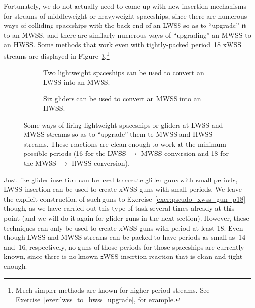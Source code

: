 Fortunately, we do not actually need to come up with new insertion mechanisms for streams of middleweight or heavyweight spaceships, since there are numerous ways of colliding spaceships with the back end of an LWSS so as to ``upgrade'' it to an MWSS, and there are similarly numerous ways of ``upgrading'' an MWSS to an HWSS. Some methods that work even with tightly-packed period~18 xWSS streams are displayed in Figure~\ref{fig:xwss_upgrade}.\footnote{Much simpler methods are known for higher-period streams. See Exercise~\ref{exer:lwss_to_hwss_upgrade}, for example.}

\begin{figure}[!htb]
	\centering
	\begin{subfigure}{0.525\textwidth}
		\centering
		\caption{Two lightweight spaceships can be used to convert an LWSS into an MWSS.}\label{fig:lwss_upgrade}
	\end{subfigure} \hfill \begin{subfigure}{0.445\textwidth}
		\centering
		\caption{Six gliders can be used to convert an MWSS into an HWSS.}\label{fig:mwss_upgrade}
	\end{subfigure}
	\caption{Some ways of firing lightweight spaceships or gliders at LWSS and MWSS streams so as to ``upgrade'' them to MWSS and HWSS streams. These reactions are clean enough to work at the minimum possible periods (16 for the LWSS $\rightarrow$ MWSS conversion and 18 for the MWSS $\rightarrow$ HWSS conversion).}\label{fig:xwss_upgrade}
\end{figure}

Just like glider insertion can be used to create glider guns with small periods, LWSS insertion can be used to create xWSS guns with small periods. We leave the explicit construction of such guns to Exercise~\ref{exer:pseudo_xwss_gun_p18} though, as we have carried out this type of task several times already at this point (and we will do it again for glider guns in the next section). However, these techniques can only be used to create xWSS guns with period at least 18. Even though LWSS and MWSS streams can be packed to have periods as small as~14 and~16, respectively, no guns of those periods for those spaceships are currently known, since there is no known xWSS insertion reaction that is clean and tight enough.



